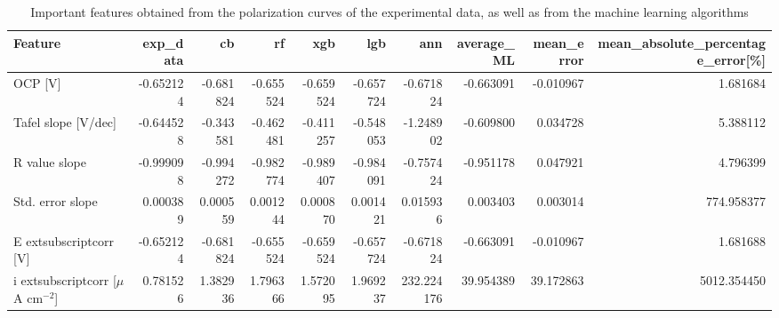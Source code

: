 \begin{table}[H]
\centering
\caption{Important features obtained from the polarization curves of the experimental data, as well as from the machine learning algorithms}
\label{imp_feat_ph_4.4}
\begin{tabular}{lrrrrrrrrr}
\toprule
Feature & exp_data & cb & rf & xgb & lgb & ann & average_ML & mean_error & mean_absolute_percentage_error[\%] \\
\midrule
OCP [V] & -0.652124 & -0.681824 & -0.655524 & -0.659524 & -0.657724 & -0.671824 & -0.663091 & -0.010967 & 1.681684 \\
Tafel slope [V/dec] & -0.644528 & -0.343581 & -0.462481 & -0.411257 & -0.548053 & -1.248902 & -0.609800 & 0.034728 & 5.388112 \\
R value slope & -0.999098 & -0.994272 & -0.982774 & -0.989407 & -0.984091 & -0.757424 & -0.951178 & 0.047921 & 4.796399 \\
Std. error slope & 0.000389 & 0.000559 & 0.001244 & 0.000870 & 0.001421 & 0.015936 & 0.003403 & 0.003014 & 774.958377 \\
E	extsubscript{corr} [V] & -0.652124 & -0.681824 & -0.655524 & -0.659524 & -0.657724 & -0.671824 & -0.663091 & -0.010967 & 1.681688 \\
i	extsubscript{corr} [$\mu$A cm$^{-2}$] & 0.781526 & 1.382936 & 1.796366 & 1.572095 & 1.969237 & 232.224176 & 39.954389 & 39.172863 & 5012.354450 \\
\bottomrule
\end{tabular}
\end{table}
